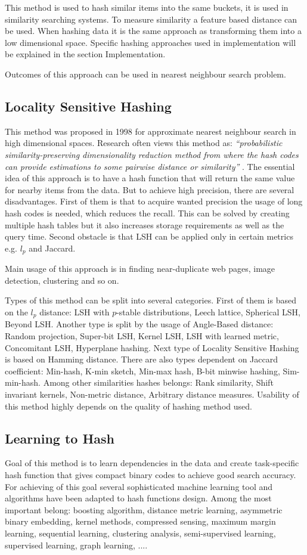 This method is used to hash similar items into the same buckets, it is used in similarity searching systems. To measure similarity a feature based distance can be used. When hashing data it is the same approach as transforming them into a low dimensional space. Specific hashing approaches used in implementation will be explained in the section Implementation.

Outcomes of this approach can be used in nearest neighbour search problem.

\subsection{Locality Sensitive Hashing}\label{LSH}
This method was proposed in 1998 for approximate nearest neighbour search in high dimensional spaces. Research often views this method as: \textit{``probabilistic similarity-preserving dimensionality reduction method from where the hash codes can provide estimations to some pairwise distance or similarity''}  \cite{hashing}. The essential idea of this approach is to have a hash function that will return the same value for nearby items from the data. But to achieve high precision, there are several disadvantages. First of them is that to acquire wanted precision the usage of long hash codes is needed, which reduces the recall. This can be solved by creating multiple hash tables but it also increases storage requirements as well as the query time. Second obstacle is that LSH can be applied only in certain metrics e.g. $l_p$ and Jaccard. 

Main usage of this approach is in finding near-duplicate web pages, image detection, clustering and so on. 

Types of this method can be split into several categories.
First of them is based on the $l_p$ distance: LSH with $p$-stable distributions, Leech lattice, Spherical LSH, Beyond LSH.
Another type is split by the usage of Angle-Based distance: Random projection, Super-bit LSH, Kernel LSH, LSH with learned metric, Concomitant LSH, Hyperplane hashing.
Next type of Locality Sensitive Hashing is based on Hamming distance. There are also types dependent on Jaccard coefficient: Min-hash, K-min sketch, Min-max hash, B-bit minwise hashing, Sim-min-hash.
Among other similarities hashes belongs: Rank similarity, Shift invariant kernels, Non-metric distance, Arbitrary distance measures.
Usability of this method highly depends on the quality of hashing method used.
\subsection{Learning to Hash}
Goal of this method is to learn dependencies in the data and create task-specific hash function that gives compact binary codes to achieve good search accuracy. \cite{learnHash} For achieving of this goal several sophisticated machine learning tool and algorithms have been adapted to hash functions design. Among the most important belong: boosting algorithm, distance metric learning, asymmetric binary embedding, kernel methods, compressed sensing, maximum margin learning, sequential learning, clustering analysis, semi-supervised learning, supervised learning, graph learning, ....

